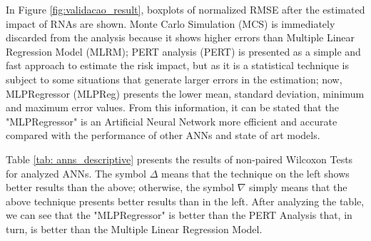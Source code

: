 In Figure \ref{fig:validacao_result}, boxplots of normalized RMSE after the estimated impact of RNAs are shown. Monte Carlo Simulation (MCS) is immediately discarded from the analysis because it shows higher errors than Multiple Linear Regression Model (MLRM); PERT analysis (PERT) is presented as a simple and fast approach to estimate the risk impact, but as it is a statistical technique is subject to some situations that generate larger errors in the estimation; now, MLPRegressor (MLPReg) presents the lower mean, standard deviation, minimum and maximum error values. From this information, it can be stated that the "MLPRegressor" is an Artificial Neural Network more efficient and accurate compared with the performance of other ANNs and state of art models.

Table \ref{tab: anns_descriptive} presents the results of non-paired Wilcoxon Tests for analyzed ANNs. The symbol $\Delta$ means that the technique on the left shows better results than the above; otherwise, the symbol $\nabla$ simply means that the above technique presents better results than in the left. After analyzing the table, we can see that the "MLPRegressor" is better than the PERT Analysis that, in turn, is better than the Multiple Linear Regression Model.

